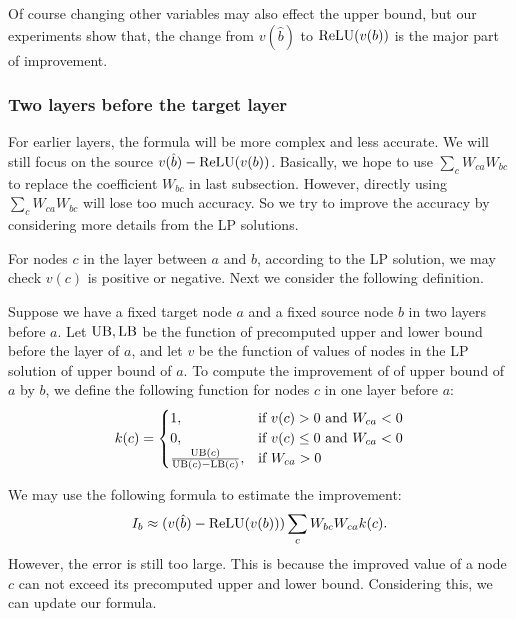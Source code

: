 Of course changing other variables may also effect the upper bound, but our experiments show that, the change from $v(\hat{b})$ to $\mathrm{ReLU}(v(b))$ is the major part of improvement. 




\subsubsection*{Two layers before the target layer}

For earlier layers, the formula will be more complex and less accurate. We will still focus on the source $v(\hat{b})-\mathrm{ReLU}(v(b))$. Basically, we hope to use $\sum_c W_{ca}W_{bc}$ to replace the coefficient $W_{bc}$ in last subsection. However, directly using $\sum_c W_{ca}W_{bc}$ will lose too much accuracy. So we try to improve the accuracy by considering more details from the LP solutions.

For nodes $c$ in the layer between $a$ and $b$, according to the LP solution, we may check $v(c)$ is positive or negative. Next we consider the following definition. 

\begin{definition} \label{2layer}
	Suppose we have a fixed target node $a$ and a fixed source node $b$ in two layers before $a$. Let $\mathrm{UB},\mathrm{LB}$ be the function of precomputed upper and lower bound before the layer of $a$, and let $v$ be the function of values of nodes in the LP solution of upper bound of $a$. 
	To compute the improvement of of upper bound of $a$ by $b$, we define the following function for nodes $c$ in one layer before $a$:
	\begin{align}
		k(c) =
		\begin{cases}
			1, & \text{if } v(c) > 0 \text{ and } W_{ca} < 0\\
			0, & \text{if } v(c) \leq 0 \text{ and } W_{ca} < 0\\
			\frac{\mathrm{UB}(c)}{\mathrm{UB}(c)-\mathrm{LB}(c)}, & \text{if }W_{ca} > 0
		\end{cases}
	\end{align} 
\end{definition} 

We may use the following formula to estimate the improvement:  \begin{align*}
	I_b \approx (v(\hat{b})-\mathrm{ReLU}(v(b)))\sum_c W_{bc}W_{ca}k(c).
\end{align*}However, the error is still too large. This is because the improved value of a node $c$ can not exceed its precomputed upper and lower bound. Considering this, we can update our formula.

